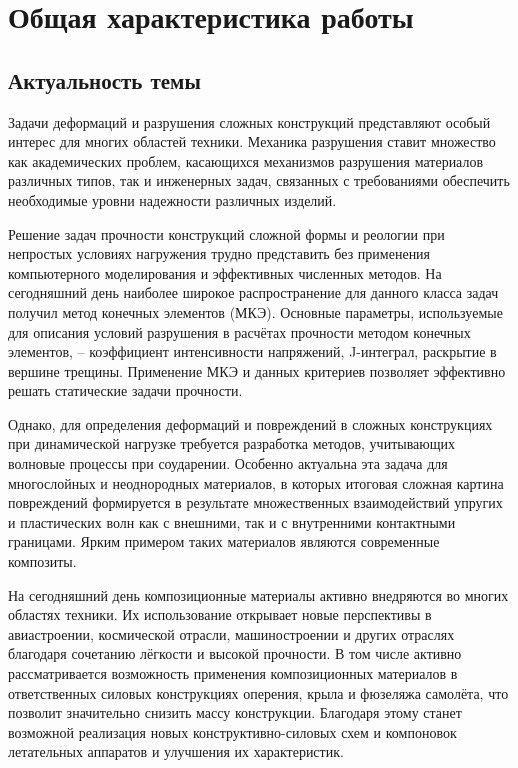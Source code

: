 \section*{Общая характеристика работы}

\subsection*{Актуальность темы}

Задачи деформаций и разрушения сложных конструкций представляют особый интерес для многих областей техники. Механика разрушения ставит множество как академических проблем, касающихся механизмов разрушения материалов различных типов, так и инженерных задач, связанных с требованиями обеспечить необходимые уровни надежности различных изделий.

Решение задач прочности конструкций сложной формы и реологии при непростых условиях нагружения трудно представить без применения компьютерного моделирования и эффективных численных методов. На сегодняшний день наиболее широкое распространение для данного класса задач получил метод конечных элементов (МКЭ). Основные параметры, используемые для описания условий разрушения в расчётах прочности методом конечных элементов, -- коэффициент интенсивности напряжений, J-интеграл, раскрытие в вершине трещины. Применение МКЭ и данных критериев позволяет эффективно решать статические задачи прочности.

Однако, для определения деформаций и повреждений в сложных конструкциях при динамической нагрузке требуется разработка методов, учитывающих волновые процессы при соударении. Особенно актуальна эта задача для многослойных и неоднородных материалов, в которых итоговая сложная картина повреждений формируется в результате множественных взаимодействий упругих и пластических волн как с внешними, так и с внутренними контактными границами. Ярким примером таких материалов являются современные композиты.

На сегодняшний день композиционные материалы активно внедряются во многих областях техники. Их использование открывает новые перспективы в авиастроении, космической отрасли, машиностроении и других отраслях благодаря сочетанию лёгкости и высокой прочности. В том числе активно рассматривается возможность применения композиционных материалов в ответственных силовых конструкциях оперения, крыла и фюзеляжа самолёта, что позволит значительно снизить массу конструкции. Благодаря этому станет возможной реализация новых конструктивно-силовых схем и компоновок летательных аппаратов и улучшения их характеристик.

